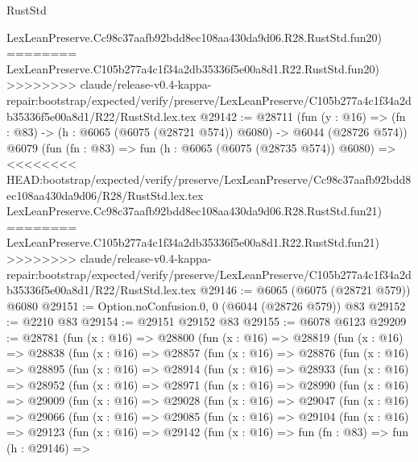 \begin{lexlean}{RustStd}
\begin{coremodule}
{\begin{coremodule}
{{{{{{{{{{{{{{{{{{{{{{{{{{    LexLeanPreserve.Cc98c37aafb92bdd8ec108aa430da9d06.R28.RustStd.fun20)
========
    LexLeanPreserve.C105b277a4c1f34a2db35336f5e00a8d1.R22.RustStd.fun20)
>>>>>>>> claude/release-v0.4-kappa-repair:bootstrap/expected/verify/preserve/LexLeanPreserve/C105b277a4c1f34a2db35336f5e00a8d1/R22/RustStd.lex.tex
@29142 := @28711
    (fun (y : @16) => (fn : @83) -> (h : @6065 (@6075 (@28721 @574)) @6080) -> @6044 (@28726 @574))
    @6079
    (fun (fn : @83) =>
    fun (h : @6065 (@6075 (@28735 @574)) @6080) =>
<<<<<<<< HEAD:bootstrap/expected/verify/preserve/LexLeanPreserve/Cc98c37aafb92bdd8ec108aa430da9d06/R28/RustStd.lex.tex
    LexLeanPreserve.Cc98c37aafb92bdd8ec108aa430da9d06.R28.RustStd.fun21)
========
    LexLeanPreserve.C105b277a4c1f34a2db35336f5e00a8d1.R22.RustStd.fun21)
>>>>>>>> claude/release-v0.4-kappa-repair:bootstrap/expected/verify/preserve/LexLeanPreserve/C105b277a4c1f34a2db35336f5e00a8d1/R22/RustStd.lex.tex
@29146 := @6065 (@6075 (@28721 @579)) @6080
@29151 := Option.noConfusion.{0, 0} (@6044 (@28726 @579)) @83
@29152 := @2210 @83
@29154 := @29151 @29152 @83
@29155 := @6078 @6123
@29209 := @28781
    (fun (x : @16) =>
    @28800
      (fun (x : @16) =>
      @28819
        (fun (x : @16) =>
        @28838
          (fun (x : @16) =>
          @28857
            (fun (x : @16) =>
            @28876
              (fun (x : @16) =>
              @28895
                (fun (x : @16) =>
                @28914
                  (fun (x : @16) =>
                  @28933
                    (fun (x : @16) =>
                    @28952
                      (fun (x : @16) =>
                      @28971
                        (fun (x : @16) =>
                        @28990
                          (fun (x : @16) =>
                          @29009
                            (fun (x : @16) =>
                            @29028
                              (fun (x : @16) =>
                              @29047
                                (fun (x : @16) =>
                                @29066
                                  (fun (x : @16) =>
                                  @29085
                                    (fun (x : @16) =>
                                    @29104
                                      (fun (x : @16) =>
                                      @29123
                                        (fun (x : @16) =>
                                        @29142
                                          (fun (x : @16) =>
                                          fun (fn : @83) =>
                                          fun (h : @29146) =>
}}}}}}}}}}}}}}}}}}}}}}}}}}
\end{coremodule}}
\end{coremodule}
\end{lexlean}
